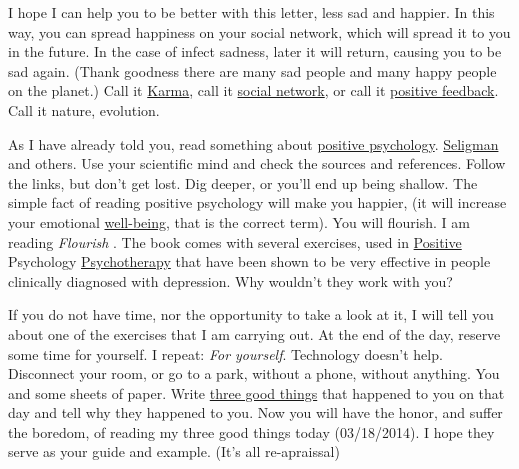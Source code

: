 \documentclass[]{book}
\begin{document}
I hope I can help you to be better with this letter, less sad and happier. In this way, you can spread happiness on your social network, which will spread it to you in the future. In the case of infect sadness, later it will return, causing you to be sad again. (Thank goodness there are many sad people and many happy people on the planet.) Call it \href{https://en.wikipedia.org/wiki/Karma}{Karma}, call it \href{https://en.wikipedia.org/wiki/Social_network}{social network}, or call it \href{https://en.wikipedia.org/wiki/Positive_feedback}{positive feedback}. Call it nature, evolution.

As I have already told you, read something about \href{https://en.wikipedia.org/wiki/Positive_psychology}{positive psychology}. \href{https://en.wikipedia.org/wiki/Martin_Seligman}{Seligman} and others. Use your scientific mind and check the sources and references. Follow the links, but don't get lost. Dig deeper, or you'll end up being shallow. The simple fact of reading positive psychology will make you happier, (it will increase your emotional \href{https://en.wikipedia.org/wiki/Well-being}{well-being}, that is the correct term). You will flourish. I am reading \emph{Flourish} \citep{seligman2012flourish}. The book comes with several exercises, used in \href{https://positivepsychology.com/positive-psychotherapy-research-effects-treatment/}{Positive} Psychology \href{https://en.wikipedia.org/wiki/Positive_psychotherapy}{Psychotherapy} that have been shown to be very effective in people clinically diagnosed with depression\citep{seligman2012flourish}. Why wouldn't they work with you?

If you do not have time, nor the opportunity to take a look at it, I will tell you about one of the exercises that I am carrying out. At the end of the day, reserve some time for yourself. I repeat: \emph{For yourself}. Technology doesn't help. Disconnect your room, or go to a park, without a phone, without anything. You and some sheets of paper. Write \href{https://ggia.berkeley.edu/practice/gratitude_journal}{three good things} that happened to you on that day and tell why they happened to you. Now you will have the honor, and suffer the boredom, of reading my three good things today (03/18/2014). I hope they serve as your guide and example. (It's all re-apraissal)
\end{document}
